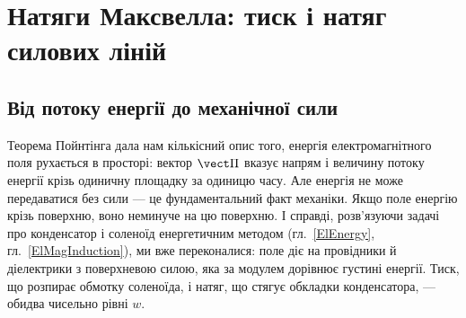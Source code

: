 


\section{Натяги Максвелла: тиск і натяг силових ліній}\label{sec:MaxwellStresses}

\subsection*{Від потоку енергії до механічної сили}

Теорема Пойнтінга дала нам кількісний опис того,  енергія електромагнітного поля рухається в просторі: вектор $\vect\Pi$ вказує
напрям і величину потоку енергії крізь одиничну площадку за одиницю часу. Але енергія не може передаватися без сили --- це фундаментальний
факт механіки. Якщо поле  енергію крізь поверхню, воно неминуче  на цю поверхню. І справді,
розв'язуючи задачі про конденсатор і соленоїд енергетичним методом (гл.~\ref{ElEnergy}, гл.~\ref{ElMagInduction}), ми вже переконалися: поле
діє на провідники й діелектрики з поверхневою силою, яка за модулем дорівнює густині енергії. Тиск, що розпирає обмотку соленоїда, і натяг,
що стягує обкладки конденсатора, --- обидва чисельно рівні $w$.

